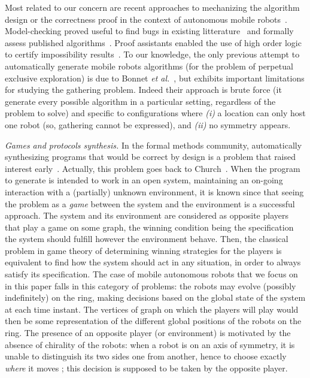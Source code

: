 \documentclass[envcountsame]{llncs} \usepackage[english]{babel}
\begin{document}
Most related to our concern are recent approaches to mechanizing the algorithm design or the correctness proof in the context of autonomous mobile robots~\cite{BDPPT12c,DLPRT12c,BMPTT13c,ABCTU13c}. Model-checking proved useful to find bugs in existing litterature~\cite{BMPTT13c} and formally assess published algorithms~\cite{DLPRT12c,BMPTT13c}. Proof assistants enabled the use of high order logic to certify impossibility results~\cite{ABCTU13c}. To our knowledge, the only previous attempt to automatically generate mobile robots algorithms (for the problem of perpetual exclusive exploration) is due to Bonnet \emph{et al.}~\cite{BDPPT12c}, but exhibits important limitations for studying the gathering problem. Indeed their approach is brute force (it generate every possible algorithm in a particular setting, regardless of the problem to solve) and specific to configurations where \emph{(i)} a location can only host one robot (so, gathering cannot be expressed), and \emph{(ii)} no symmetry appears.

\textit{Games and protocols synthesis.} In the formal methods community, 
automatically synthesizing programs that would be correct by design is a problem that raised interest early~\cite{emersonclarke:1981,MannaWolper84,AbadiLamportWolper89,PnueliRosner89a}. Actually, this problem goes back to Church~\cite{Church62,BuchiLandweber69}. When the program to generate is intended to work in an open system, maintaining an on-going interaction with a (partially) unknown environment, it is known since \cite{BuchiLandweber69} that seeing the problem as a \emph{game} between the system and the environment is a successful approach. The system and its environment are considered as opposite players that play a game on some graph, the winning condition being the specification the system should fulfill however the environment behave. Then, the classical problem in game theory of determining winning strategies for the players is equivalent to find how the system should act in any situation, in order to always satisfy its specification. The case of mobile autonomous robots that we focus on in this paper falls in this category of problems: the robots may evolve (possibly indefinitely) on the ring, making decisions based on the global state of the system at each time instant. The vertices of graph on which the players will play would then be some representation of the different global positions of the robots on the ring. The presence of an opposite player (or environment) is motivated by the absence of chirality of the robots: when a robot is on an axis of symmetry, it is unable to distinguish its two sides one from another, hence to choose exactly \emph{where}
it moves ; this decision is supposed to be taken by the opposite player.
\end{document}
